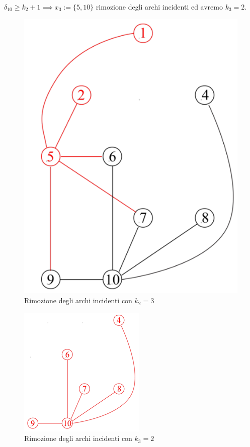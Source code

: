 \documentclass{article}
\begin{document}
$\delta_10\geq k_2+1\implies x_3 := \{5,10\}$ rimozione degli archi incidenti ed avremo $k_3=2$.
\begin{figure}[H]
    \centering
    \includegraphics[scale=1]{images/kerneliz_2.png}
    \caption{Rimozione degli archi incidenti con $k_2=3$}
\end{figure}

\begin{figure}[H]
    \centering
    \includegraphics[scale=1]{images/kerneliz_3.png}
    \caption{Rimozione degli archi incidenti con $k_3=2$}
\end{figure}
\end{document}
